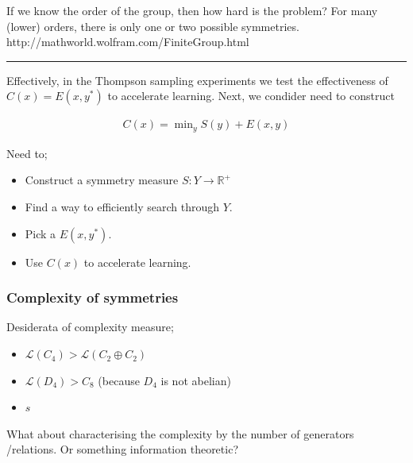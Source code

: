 

If we know the order of the group, then how hard is the problem?
For many (lower) orders, there is only one or two possible symmetries. http://mathworld.wolfram.com/FiniteGroup.html

\begin{center}\rule{0.5\linewidth}{\linethickness}\end{center}

Effectively, in the Thompson sampling experiments we test the effectiveness of $C(x) = E(x, y^{* })$ to accelerate learning.
Next, we condider need to construct

\begin{align*}
C(x) = \mathop{\text{min}}_y S(y) + E(x, y)
\end{align*}

Need to;

\begin{itemize}
	\tightlist
	\item Construct a symmetry measure $S: Y \to \mathbb R^+$
	\item Find a way to efficiently search through $Y$.
	\item Pick a $E(x, y^{* })$.
	\item Use $C(x)$ to accelerate learning.
\end{itemize}

\subsubsection{Complexity of symmetries}

Desiderata of complexity measure;
\begin{itemize}
	\tightlist
	\item $\mathcal L(C_4) > \mathcal L(C_2\oplus C_2)$
	\item $\mathcal L(D_4) > C_8$ (because $D_4$ is not abelian)
	\item $s$
\end{itemize}

What about characterising the complexity by the number of generators /relations.
Or something information theoretic?

